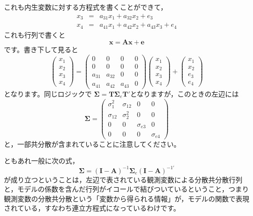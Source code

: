 \documentclass{ltjsbook}
\begin{document}
これも内生変数に対する方程式を書くことができて，
\[ \begin{array}{ccl}
		x_3 & = & a_{31}x_1 + a_{32}x_2 + e_3             \\
		x_4 & = & a_{41}x_1 + a_{42}x_2 + a_{43}x_3 + e_4
	\end{array}
\]
これも行列で書くと
\[ \bm{x} = \bm{Ax}+\bm{e} \]
です。書き下して見ると
\[
	\begin{pmatrix} x_1 \\ x_2 \\x_3 \\ x_4 \end{pmatrix} =
	\begin{pmatrix} 0      & 0      & 0      & 0 \\ 0 & 0 & 0 & 0 \\
                a_{31} & a_{32} & 0      & 0 \\
                a_{41} & a_{42} & a_{43} & 0\end{pmatrix}
	\begin{pmatrix} x_1 \\ x_2 \\ x_3 \\ x_4 \end{pmatrix}
	+
	\begin{pmatrix} x_1 \\ x_2 \\ e_3 \\ e_4\end{pmatrix}
\]
となります。同じロジックで
$\bm{\Sigma} = \bm{T}\bm{\Sigma}_e\bm{T}' $となりますが，このときの左辺には
\[
	\bm{\Sigma} =
	\begin{pmatrix}
		\sigma_1^2  & \sigma_{12} & 0           & 0           \\
		\sigma_{12} & \sigma_2^2  & 0           & 0           \\
		0           & 0           & \sigma_{e3} & 0           \\
		0           & 0           & 0           & \sigma_{e4}\end{pmatrix}
\]
と，一部共分散が含まれていることに注意してください。

ともあれ一般に次の式，
\[ \bm{\Sigma} = (\bm{I}-\bm{A})^{-1} \bm{\Sigma}_e (\bm{I}-\bm{A})^{-1\prime} \]
が成り立つということは，左辺で表されている観測変数による分散共分散行列と，モデルの係数を含んだ行列がイコールで結びついているということ，つまり観測変数の分散共分散という「変数から得られる情報」が，モデルの関数で表現されている，すなわち連立方程式になっているわけです。
\end{document}
